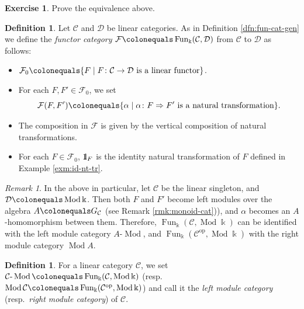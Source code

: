 \documentclass{surv-l}
\numberwithin{equation}{chapter}
\numberwithin{figure}{chapter}
\theoremstyle{plain}
\theoremstyle{definition}
\newtheorem{dfn}[thm]{Definition}
\newtheorem{exc}[thm]{Exercise}
\theoremstyle{remark}
\newtheorem{rmk}[thm]{Remark}
\newcommand{\id}{1\kern-.25em{\text{{\rm l}}}}
\DeclareMathOperator{\Mod}{Mod}
\DeclareMathOperator{\Fun}{Fun}
\begin{document}
\begin{exc}
Prove the equivalence above.
\end{exc}

\begin{dfn}\label{dfn:fun-cat}
Let ${\mathcal{C}}$ and ${\mathcal{D}}$ be linear categories.
As in Definition \ref{dfn:fun-cat-gen}
we define the \emph{functor category}
$\mathcal{F}\colonequals \Fun_\Bbbk({\mathcal{C}}, {\mathcal{D}})$ from ${\mathcal{C}}$ to ${\mathcal{D}}$
as follows:
\begin{itemize}
\item
$\mathcal{F}_0\colonequals \{F \mid F\colon {\mathcal{C}} \to {\mathcal{D}} \text{ is a linear functor}\}$.
\item
For each $F, F' \in \mathcal{F}_0$, we set
\[
\mathcal{F}(F, F')\colonequals  \{\alpha \mid  \alpha \colon F \Rightarrow F' \text{ is a natural transformation}\}.
\]
\item
The composition in $\mathcal{F}$ is given by the vertical composition of
natural transformations.
\item
For each $F \in \mathcal{F}_0$, $\id_F$ is the identity natural transformation
of $F$ defined in Example \ref{exm:id-nt-tr}.
\end{itemize}
\end{dfn}

\begin{rmk}
In the above in particular, let ${\mathcal{C}}$ be the linear singleton,
and ${\mathcal{D}}\colonequals  \Mod\Bbbk$.
Then both $F$ and $F'$ become left modules over the algebra $A\colonequals G_{{\mathcal{C}}}$
(see Remark \ref{rmk:monoid-cat})), and
$\alpha$ becomes an $A$-homomorphism between them.
Therefore, $\Fun_\Bbbk({\mathcal{C}}, \Mod\Bbbk)$ can be identified with
the left module category $A\text{-}\Mod$, and
$\Fun_\Bbbk({\mathcal{C}}^{\mathrm{op}}, \Mod\Bbbk)$ with the right module category $\Mod A$.
\end{rmk}

\begin{dfn}\label{dfn:submodule}
For a linear category ${\mathcal{C}}$, we set
${\mathcal{C}}\text{-}\Mod \colonequals  \Fun_\Bbbk({\mathcal{C}}, \Mod \Bbbk)$
(resp.\ $\Mod {\mathcal{C}}\colonequals  \Fun_\Bbbk({\mathcal{C}}^{\mathrm{op}}, \Mod \Bbbk)$) and call it
the \emph{left module category}
(resp.\ \emph{right module category}) of ${\mathcal{C}}$.
\end{dfn}
\end{document}
